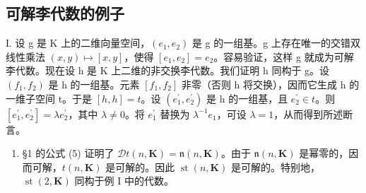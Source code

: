 \subsection*{可解李代数的例子}

I. 设 g 是 K 上的二维向量空间，\((e_{1}, e_{2})\) 是 g 的一组基。g 上存在唯一的交错双线性乘法 \((x, y) \mapsto [x, y]\)，使得 \([e_{1}, e_{2}] = e_{2}\)。容易验证，这样 g 就成为可解李代数。现在设 h 是 K 上二维的非交换李代数。我们证明 h 同构于 g。设 \((f_{1}, f_{2})\) 是 h 的一组基。元素 \([f_{1}, f_{2}]\) 非零（否则 h 将交换），因而它生成 h 的一维子空间 t。于是 \([h, h] = t\)。设 \((e_{1}^{\prime}, e_{2}^{\prime})\) 是 h 的一组基，且 \(e_{2}^{\prime} \in t\)。则 \([e_{1}^{\prime}, e_{2}^{\prime}] = \lambda e_{2}^{\prime}\)，其中 \(\lambda \neq 0\)。将 \(e_{1}^{\prime}\) 替换为 \(\lambda^{-1}e_{1}\)，可设 \(\lambda = 1\)，从而得到所述断言。

\begin{enumerate}
\def\labelenumi{\Roman{enumi}.}
\setcounter{enumi}{1}
\tightlist
\item
  §1 的公式 (5) 证明了 \(\mathcal{D}t(n, \mathbf{K}) = \mathfrak{n}(n, \mathbf{K})\)。由于 \(\mathfrak{n}(n, \mathbf{K})\) 是幂零的，因而可解，\(t(n, \mathbf{K})\) 是可解的。因此 \(\operatorname{st}(n, \mathbf{K})\) 是可解的。特别地，\(\operatorname{st}(2, \mathbf{K})\) 同构于例 I 中的代数。
\end{enumerate}

